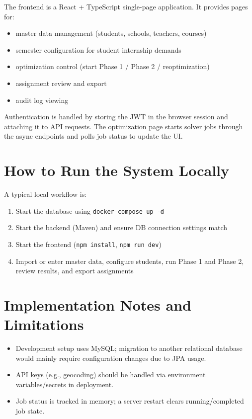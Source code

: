 \documentclass[12pt,a4paper]{report}
\begin{document}
The frontend is a React + TypeScript single-page application. It provides pages for:

\begin{itemize}
    \item master data management (students, schools, teachers, courses)
    \item semester configuration for student internship demands
    \item optimization control (start Phase 1 / Phase 2 / reoptimization)
    \item assignment review and export
    \item audit log viewing
\end{itemize}

Authentication is handled by storing the JWT in the browser session and attaching it to API requests. The optimization page starts solver jobs through the async endpoints and polls job status to update the UI.

\section{How to Run the System Locally}

A typical local workflow is:

\begin{enumerate}
    \item Start the database using \texttt{docker-compose up -d}
    \item Start the backend (Maven) and ensure DB connection settings match
    \item Start the frontend (\texttt{npm install}, \texttt{npm run dev})
    \item Import or enter master data, configure students, run Phase 1 and Phase 2, review results, and export assignments
\end{enumerate}

\section{Implementation Notes and Limitations}

\begin{itemize}
    \item Development setup uses MySQL; migration to another relational database would mainly require configuration changes due to JPA usage.
    \item API keys (e.g., geocoding) should be handled via environment variables/secrets in deployment.
    \item Job status is tracked in memory; a server restart clears running/completed job state.
\end{itemize}
\end{document}
